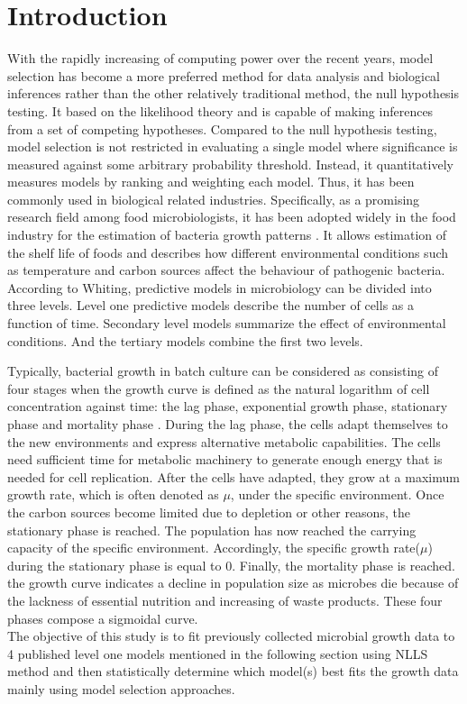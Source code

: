 
\section{Introduction}

With the rapidly increasing of computing power over the recent years, model selection has become a more preferred method for data analysis and biological inferences rather than the other relatively traditional method, the null hypothesis testing\citep{JOHNSON2004101}. It based on the likelihood theory and is capable of making inferences from a set of competing hypotheses. Compared to the null hypothesis testing, model selection is not restricted in evaluating a single model where significance is measured against some arbitrary probability threshold. Instead, it quantitatively measures models by ranking and weighting each model. Thus, it has been commonly used in biological related industries. Specifically, as a promising research field among food microbiologists, it has been adopted widely in the food industry for the estimation of bacteria growth patterns \citep{Baranyi1993,Garthright1991}. It allows estimation of the shelf life of foods and describes how different environmental conditions such as temperature and carbon sources affect the behaviour of pathogenic bacteria\citep{MCCLURE1994265}. According to Whiting, predictive models in microbiology can be divided into three levels\citep{whiting1995microbial}. Level one predictive models describe the number of cells as a function of time. Secondary level models summarize the effect of environmental conditions. And the tertiary models combine the first two levels.

Typically, bacterial growth in batch culture can be considered as consisting of four stages when the growth curve is defined as the natural logarithm of cell concentration against time: the lag phase, exponential growth phase, stationary phase and mortality phase \citep{mckellar2004primary}. During the lag phase, the cells adapt themselves to the new environments and express alternative metabolic capabilities. The cells need sufficient time for metabolic machinery to generate enough energy that is needed for cell replication\citep{Buchanan1997}. After the cells have adapted, they grow at a maximum growth rate, which is often denoted as $\mu$, under the specific environment. Once the carbon sources become limited due to depletion or other reasons, the stationary phase is reached. The population has now reached the carrying capacity of the specific environment. Accordingly, the specific growth rate($\mu$) during the stationary phase is equal to 0. Finally, the mortality phase is reached. the growth curve indicates a decline in population size as microbes die because of the lackness of essential nutrition and increasing of waste products. These four phases compose a sigmoidal curve.\\

The objective of this study is to fit previously collected microbial growth data to 4 published level one models mentioned in the following section using NLLS method and then statistically determine which model(s) best fits the growth data mainly using model selection approaches. \\

